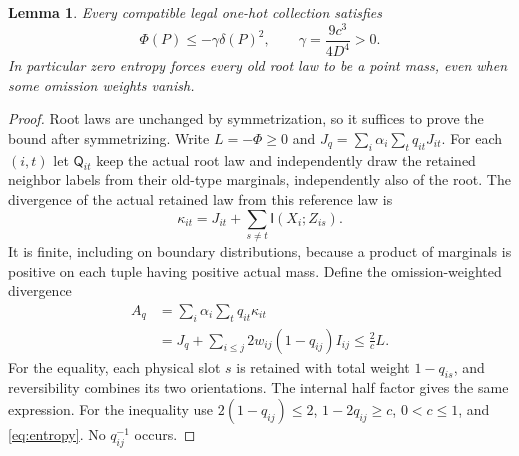 \documentclass[11pt]{article}
\newtheorem{lemma}{Lemma}
\newcommand{\II}{\mathsf I}
\begin{document}
\begin{lemma}\label{lem:gap}
Every compatible legal one-hot collection satisfies
\begin{equation}\label{eq:gap}
 \Phi(P)\le-\gamma\delta(P)^2,
 \qquad \gamma=\frac{9c^3}{4D^4}>0.
\end{equation}
In particular zero entropy forces every old root law to be a point
mass, even when some omission weights vanish.
\end{lemma}
\begin{proof}
Root laws are unchanged by symmetrization, so it suffices to prove the
bound after symmetrizing. Write $L=-\Phi\ge0$ and
$J_q=\sum_i\alpha_i\sum_tq_{it}J_{it}$.
For each $(i,t)$ let $\mathsf Q_{it}$ keep the actual root law and
independently draw the retained neighbor labels from their old-type
marginals, independently also of the root. The divergence of the actual
retained law from this reference law is
\[
 \kappa_{it}=J_{it}+\sum_{s\ne t}\II(X_i;Z_{is}).
\]
It is finite, including on boundary distributions, because a product
of marginals is positive on each tuple having positive actual mass.
Define the omission-weighted divergence
\begin{align}\label{eq:kappa}
 A_q&=\sum_i\alpha_i\sum_tq_{it}\kappa_{it}\nonumber\\
 &=J_q+\sum_{i\le j}2w_{ij}(1-q_{ij})I_{ij}
 \le \frac{2}{c}L.
\end{align}
For the equality, each physical slot $s$ is retained with total weight
$1-q_{is}$, and reversibility combines its two orientations. The
internal half factor gives the same expression. For the inequality
use $2(1-q_{ij})\le2$, $1-2q_{ij}\ge c$,
$0<c\le1$, and \eqref{eq:entropy}. No $q_{ij}^{-1}$ occurs.


\end{proof}
\end{document}
